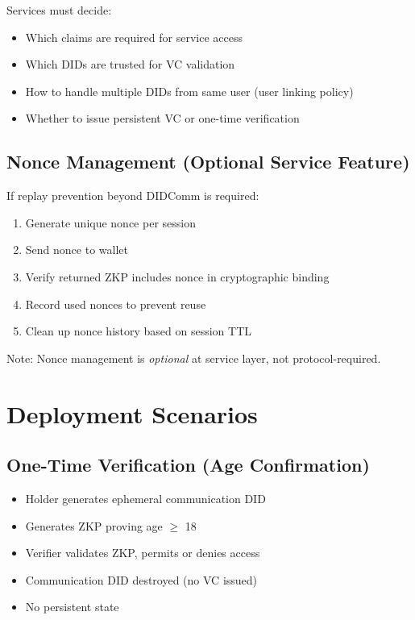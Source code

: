 Services must decide:

\begin{itemize}
  \item Which claims are required for service access
  \item Which DIDs are trusted for VC validation
  \item How to handle multiple DIDs from same user (user linking policy)
  \item Whether to issue persistent VC or one-time verification
\end{itemize}

\subsection{Nonce Management (Optional Service Feature)}

If replay prevention beyond DIDComm is required:

\begin{enumerate}
  \item Generate unique nonce per session
  \item Send nonce to wallet
  \item Verify returned ZKP includes nonce in cryptographic binding
  \item Record used nonces to prevent reuse
  \item Clean up nonce history based on session TTL
\end{enumerate}

Note: Nonce management is \emph{optional} at service layer, not protocol-required.

\section{Deployment Scenarios}

\subsection{One-Time Verification (Age Confirmation)}

\begin{itemize}
  \item Holder generates ephemeral communication DID
  \item Generates ZKP proving age $\geq$ 18
  \item Verifier validates ZKP, permits or denies access
  \item Communication DID destroyed (no VC issued)
  \item No persistent state
\end{itemize}

